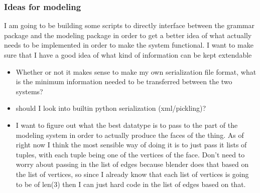 \documentclass[letterpaper,oneside,titlepage]{article}
\begin{document}
\subsubsection*{Ideas for modeling}
I am going to be building some scripts to directly interface between the grammar package and the modeling package in order to get a better idea of what actually needs to be implemented in order to make the system functional.  I want to make sure that I have a good idea of what kind of information can be kept extendable
\begin{itemize}
\item Whether or not it makes sense to make my own serialization file format, what is the minimum information needed to be transferred between the two systems?
\item should I look into builtin python serialization (xml/pickling)?
\item I want to figure out what the best datatype is to pass to the part of the modeling system in order to actually produce the faces of the thing.  As of right now I think the most sensible way of doing it is to just pass it lists of tuples, with each tuple being one of the vertices of the face.  Don't need to worry about passing in the list of edges because blender does that based on the list of vertices, so since I already know that each list of vertices is going to be of len(3) then I can just hard code in the list of edges based on that.
\end{itemize}
\end{document}
